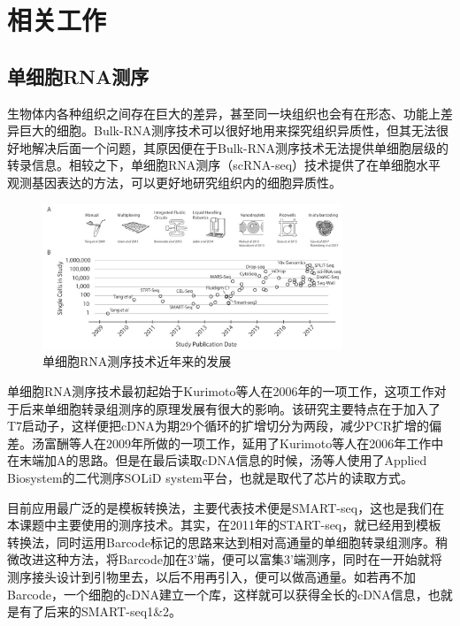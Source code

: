 
\chapter{相关工作}

\section{单细胞RNA测序}
  生物体内各种组织之间存在巨大的差异，甚至同一块组织也会有在形态、功能上差异巨大的细胞。Bulk-RNA测序技术可以很好地用来探究组织异质性，但其无法很好地解决后面一个问题，其原因便在于Bulk-RNA测序技术无法提供单细胞层级的转录信息。相较之下，单细胞RNA测序（scRNA-seq）技术提供了在单细胞水平观测基因表达的方法，可以更好地研究组织内的细胞异质性\cite{hammond2019single,keren2017unique,li2019developmental,masuda2019spatial,masuda2020novel,matcovitch2016microglia}。

\begin{figure}[!htb]
  \centering
  \includegraphics[width=0.8\textwidth]{figs/scseq-development.jpeg}
  \caption{单细胞RNA测序技术近年来的发展}
  \label{fig:scseq-development}
\end{figure}

  单细胞RNA测序技术最初起始于Kurimoto等人在2006年的一项工作\cite{kurimoto2006improved}，这项工作对于后来单细胞转录组测序的原理发展有很大的影响。该研究主要特点在于加入了T7启动子，这样便把cDNA为期29个循环的扩增切分为两段，减少PCR扩增的偏差。汤富酬等人在2009年所做的一项工作\cite{tang2009mrna}，延用了Kurimoto等人在2006年工作\cite{kurimoto2006improved}中在末端加A的思路。但是在最后读取cDNA信息的时候，汤等人使用了Applied Biosystem的二代测序SOLiD system平台，也就是取代了芯片的读取方式。

  目前应用最广泛的是模板转换法，主要代表技术便是SMART-seq\cite{ramskold2012full,picelli2013smart}，这也是我们在本课题中主要使用的测序技术。其实，在2011年的START-seq\cite{islam2011characterization}，就已经用到模板转换法，同时运用Barcode标记的思路来达到相对高通量的单细胞转录组测序。稍微改进这种方法，将Barcode加在3'端，便可以富集3'端测序，同时在一开始就将测序接头设计到引物里去，以后不用再引入，便可以做高通量。如若再不加Barcode，一个细胞的cDNA建立一个库，这样就可以获得全长的cDNA信息，也就是有了后来的SMART-seq1\&2。

